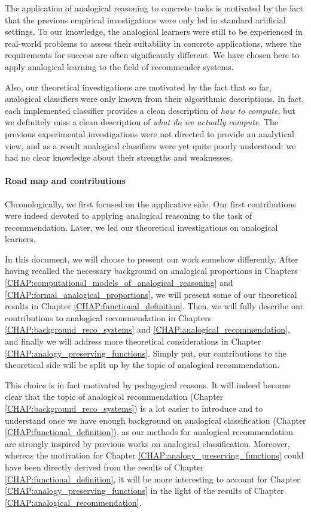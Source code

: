 The application of analogical reasoning to concrete tasks is motivated by the
fact that the previous empirical investigations were only led in standard
artificial settings. To our knowledge, the analogical learners were still to be
experienced in real-world problems to assess their suitability in concrete
applications, where the requirements for success are often significantly
different. We have chosen here to apply analogical learning to the field of
recommender systems.

Also, our theoretical investigations are motivated by the fact that so far,
analogical classifiers were only known from their algorithmic descriptions.  In
fact, each implemented classifier provides a clean description of {\it how to
compute}, but we definitely miss a clean description of {\it what do we
actually compute}. The previous experimental investigations were not directed
to provide an analytical view, and as a result analogical classifiers were yet
quite poorly understood: we had no clear knowledge about their strengths and
weaknesses.

\paragraph{Road map and contributions\\}

Chronologically, we first focused on the applicative side. Our first
contributions were indeed devoted to applying analogical reasoning to the task
of recommendation. Later, we led our theoretical investigations on
analogical learners.

In this document, we will choose to present our work somehow differently.
After having recalled the necessary background on analogical proportions in
Chapters \ref{CHAP:computational_models_of_analogical_reasoning} and
\ref{CHAP:formal_analogical_proportions}, we
will present some of our
theoretical results in Chapter \ref{CHAP:functional_definition}. Then, we will
fully describe our contributions to analogical recommendation  in Chapters
\ref{CHAP:background_reco_systems} and \ref{CHAP:analogical_recommendation},
and finally we will address more theoretical considerations in Chapter
\ref{CHAP:analogy_preserving_functions}. Simply put, our contributions to the
theoretical side will be split up by the topic of analogical recommendation.

This choice is in fact motivated by pedagogical reasons. It will
indeed become clear that the topic of analogical recommendation (Chapter
\ref{CHAP:background_reco_systems}) is a lot easier to introduce and to
understand once we have enough background on analogical classification (Chapter
\ref{CHAP:functional_definition}), as our methods for analogical recommendation
are strongly inspired by previous works on analogical classification. Moreover,
whereas the motivation for Chapter \ref{CHAP:analogy_preserving_functions}
could have been directly derived from the results of Chapter
\ref{CHAP:functional_definition}, it will be more interesting to account for
Chapter \ref{CHAP:analogy_preserving_functions} in the light of the results of
Chapter \ref{CHAP:analogical_recommendation}.

